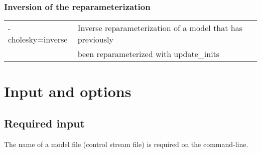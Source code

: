 \subsubsection*{Inversion of the reparameterization}
\begin{tabular}{ll}
    -cholesky=inverse &             Inverse reparameterization of a model that has previously\\
     &  been reparameterized with update\_inits\\
\end{tabular}

\section{Input and options}

\subsection{Required input}
The name of a model file (control stream file) is required on the command-line.

